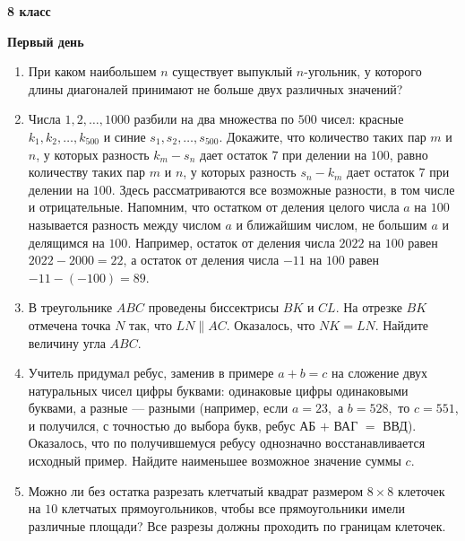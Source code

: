 \documentclass{article}
\begin{document}
    \large

    \begin{center}
        \LARGE\textbf{8 класс}
    \end{center}
    \begin{center}
        \large\textbf{Первый день}
    \end{center}


    \begin{enumerate}[label*=8.{\arabic{enumi}}]

        \item При каком наибольшем $n$ существует выпуклый $n$-угольник, у которого длины диагоналей принимают не больше двух различных значений?

        \item Числа $1, 2, \dots, 1000$ разбили на два множества по $500$ чисел: красные $k_1, k_2, \dotsc, k_{500}$ и синие $s_1, s_2, \dotsc, s_{500}$.
        Докажите, что количество таких пар $m$ и $n$, у которых разность $k_m-s_n$ дает остаток $7$ при делении на $100$, равно количеству таких пар $m$ и $n$, у которых разность $s_n-k_m$ дает остаток $7$ при делении на $100$.
        Здесь рассматриваются все возможные разности, в том числе и отрицательные.
        Напомним, что остатком от деления целого числа $a$ на $100$ называется разность между числом $a$ и ближайшим числом, не большим $a$ и делящимся на $100$.
        Например, остаток от деления числа $2022$ на $100$ равен $2022-2000 = 22$, а остаток от деления числа $-11$ на $100$ равен $-11-(-100) = 89$.

        \item В треугольнике $ABC$ проведены биссектрисы $BK$ и $CL$.
        На отрезке $BK$ отмечена точка $N$ так, что $LN \parallel AC$.
        Оказалось, что $NK = LN$.
        Найдите величину угла $ABC$.

        \item Учитель придумал ребус, заменив в примере $a+b = c$ на сложение двух натуральных чисел цифры буквами: одинаковые цифры одинаковыми буквами, а разные — разными
        (например, если $a = 23,$ а $b = 528,$ то $c = 551$, и получился, с точностью до выбора букв, ребус АБ $+$ ВАГ $=$ ВВД).
        Оказалось, что по получившемуся ребусу однозначно восстанавливается исходный пример.
        Найдите наименьшее возможное значение суммы $c$.

        \item Можно ли без остатка разрезать клетчатый квадрат размером $8 \times 8$ клеточек на $10$ клетчатых прямоугольников, чтобы все прямоугольники имели различные площади?
        Все разрезы должны проходить по границам клеточек.

    \end{enumerate}
    \newpage
\end{document}
